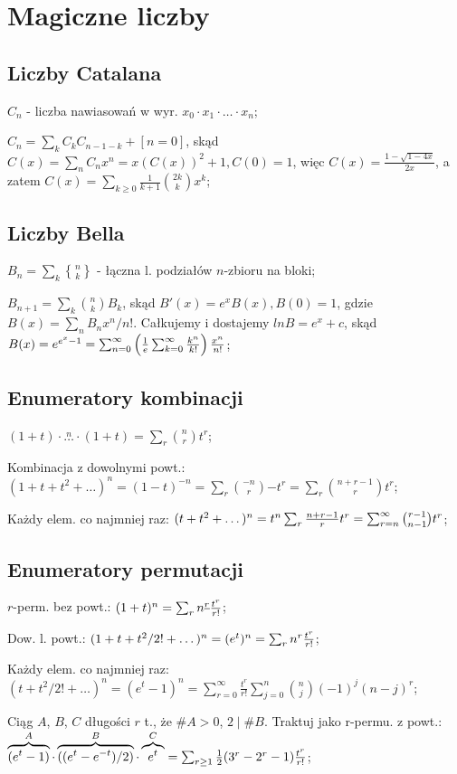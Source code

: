 \section{Magiczne liczby}

\begin{tiny}
\end{tiny}

\subsection{Liczby Catalana}

\entry
$C_n$ - liczba nawiasowań w wyr. $x_0 \cdot x_1 \cdot \dots \cdot x_n$;

\entry
$C_n = \sum_kC_kC_{n-1-k} + [n=0]$,
  skąd $C(x) = \sum_n C_nx^n = x(C(x))^2 + 1, C(0) = 1$,
  więc $C(x) = \frac{1 - \sqrt{1-4x}}{2x}$, a zatem $C(x) =
  \sum_{k\geq 0} \frac{1}{k+1}\binom{2k}{k}x^k$;

\subsection{Liczby Bella}

\entry
${B_n = \sum_k{n \brace k}}$ - łączna l. podziałów $n$-zbioru na bloki;

\entry
${B_{n+1} = \sum_k \binom{n}{k} B_k}$, skąd $B'(x) = e^xB(x), B(0) = 1$,
  gdzie $B(x) = \sum_n B_nx^n/n!$. Całkujemy i dostajemy $ln B = e^x + c$,
  skąd $B(x) = e^{e^x-1} =
  \sum_{n=0}^\infty \left ( {1 \over e} \sum_{k=0}^\infty {k^n \over k!}\right)
  {x^n \over n!}$;

\subsection{Enumeratory kombinacji}

\entry
$(1+t)\cdot\overset{n}{\ldots}\cdot(1+t) = \sum_r\binom{n}{r}t^r$;

\entry
Kombinacja z dowolnymi powt.: $(1+t+t^2+\dots)^n=(1-t)^{-n}=
  \sum_r\binom{-n}{r}{-t}^r=\sum_r\binom{n+r-1}{r}t^r$;

\entry
Każdy elem. co najmniej raz: $(t+t^2+\dots)^n = t^n\sum_r {n+r-1 \over r}t^r =
  \sum^\infty_{r=n}\binom{r-1}{n-1}t^r$;

\subsection{Enumeratory permutacji}

\entry
$r$-perm. bez powt.: $(1+t)^n = \sum_rn^{\underline{r}}{t^r \over r!}$;

\entry
Dow. l. powt.: ${(1+t+t^2/2! + \dots)^n} = {(e^{t})^n} =
  {\sum_rn^r{t^r \over r!}}$;

\entry
Każdy elem. co najmniej raz: $(t + t^2/2! + \dots)^n = (e^t - 1)^n =
  \sum^\infty_{r=0}\frac{t^r}{r!}\sum^n_{j=0}\binom{n}{j}(-1)^j(n-j)^r$;

\entry
Ciąg $A$, $B$, $C$ długości $r$ t., że $\#A>0$, $2\mid\#B$. Traktuj jako r-permu.
  z powt.:
  $\overbrace{(e^t - 1)}^A\cdot\overbrace{((e^t - e^{-t})/2)}^B
  \cdot\overbrace{e^t}^C =
  \sum_{r \geq 1} {1 \over 2}(3^r - 2^r - 1){t^r \over r!}$;
